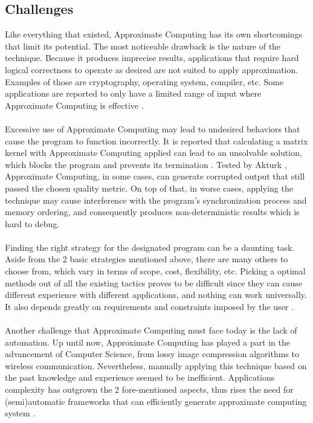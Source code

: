 \subsection{Challenges}

Like everything that existed, Approximate Computing has its own shortcomings that limit its potential. The most noticeable drawback is the nature of the technique. Because it produces imprecise results, applications that require hard logical correctness to operate as desired are not suited to apply approximation. Examples of those are cryptography, operating system, compiler, etc. Some applications are reported to only have a limited range of input where Approximate Computing is effective \cite{AxCSurvey}. \\
~\\
Excessive use of Approximate Computing may lead to undesired behaviors that cause the program to function incorrectly. It is reported that calculating a matrix kernel with Approximate Computing applied can lead to an unsolvable solution, which blocks the program and prevents its termination \cite{AxCSurvey}. Tested by Akturk \cite{Akturk2015OnQO}, Approximate Computing, in some cases, can generate corrupted output that still passed the chosen quality metric. On top of that, in worse cases, applying the technique may cause interference with the program's synchronization process and memory ordering, and consequently produces non-deterministic results which is hard to debug.\\
~\\
Finding the right strategy for the designated program can be a daunting task. Aside from the 2 basic strategies mentioned above, there are many others to choose from, which vary in terms of scope, cost, flexibility, etc. Picking a optimal methods out of all the existing tactics proves to be difficult since they can cause different experience with different applications, and nothing can work universally. It also depends greatly on requirements and constraints imposed by the user \cite{Ansel}. \\
~\\
Another challenge that Approximate Computing must face today is the lack of automation. Up until now, Approximate Computing has played a part in the advancement of Computer Science, from lossy image compression algorithms to wireless communication. Nevertheless, manually applying this technique based on the past knowledge and experience seemed to be inefficient. Applications complexity has outgrown the 2 fore-mentioned aspects, thus rises the need for (semi)automatic frameworks that can efficiently generate approximate computing system \cite{introAxC}. \\

